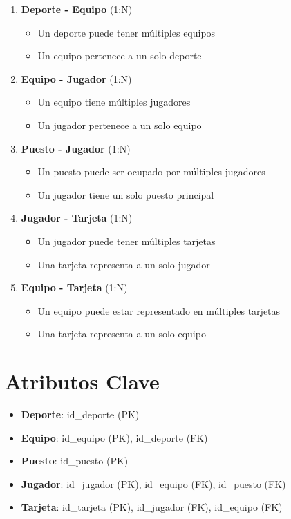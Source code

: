 \documentclass{article}
\begin{document}
\begin{enumerate}
    \item \textbf{Deporte - Equipo} (1:N)
    \begin{itemize}
        \item Un deporte puede tener múltiples equipos
        \item Un equipo pertenece a un solo deporte
    \end{itemize}
    
    \item \textbf{Equipo - Jugador} (1:N)
    \begin{itemize}
        \item Un equipo tiene múltiples jugadores
        \item Un jugador pertenece a un solo equipo
    \end{itemize}
    
    \item \textbf{Puesto - Jugador} (1:N)
    \begin{itemize}
        \item Un puesto puede ser ocupado por múltiples jugadores
        \item Un jugador tiene un solo puesto principal
    \end{itemize}
    
    \item \textbf{Jugador - Tarjeta} (1:N)
    \begin{itemize}
        \item Un jugador puede tener múltiples tarjetas
        \item Una tarjeta representa a un solo jugador
    \end{itemize}
    
    \item \textbf{Equipo - Tarjeta} (1:N)
    \begin{itemize}
        \item Un equipo puede estar representado en múltiples tarjetas
        \item Una tarjeta representa a un solo equipo
    \end{itemize}
\end{enumerate}

\section{Atributos Clave}

\begin{itemize}
    \item \textbf{Deporte}: id\_deporte (PK)
    \item \textbf{Equipo}: id\_equipo (PK), id\_deporte (FK)
    \item \textbf{Puesto}: id\_puesto (PK)
    \item \textbf{Jugador}: id\_jugador (PK), id\_equipo (FK), id\_puesto (FK)
    \item \textbf{Tarjeta}: id\_tarjeta (PK), id\_jugador (FK), id\_equipo (FK)
\end{itemize}
\end{document}
